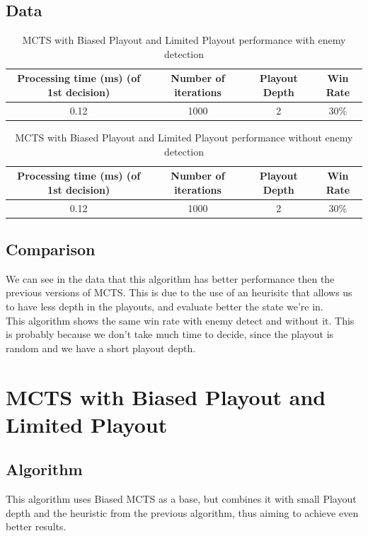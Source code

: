 \documentclass{article}
\begin{document}
  \subsection{Data}
  \begin{table}[h!]
    \centering
    \caption{MCTS with Biased Playout and Limited Playout performance with enemy detection}
    \label{tab:tableLimitedMCTS1}
    \begin{tabular}{c|c|c|c}
      \textbf{Processing time (ms) (of 1st decision)} & \textbf{Number of iterations} & \textbf{Playout Depth} & \textbf{Win Rate}\\
      \hline
      0.12 & 1000 & 2 & 30\%
    \end{tabular}
  \end{table}
  \begin{table}[h!]
    \centering
    \caption{MCTS with Biased Playout and Limited Playout performance without enemy detection}
    \label{tab:tableLimitedMCTS2}
    \begin{tabular}{c|c|c|c}
      \textbf{Processing time (ms) (of 1st decision)} & \textbf{Number of iterations} & \textbf{Playout Depth} & \textbf{Win Rate}\\
      \hline
      0.12 & 1000 & 2 & 30\%
    \end{tabular}
  \end{table}

  \subsection{Comparison}
  We can see in the data that this algorithm has better performance then the previous versions of MCTS. This is due to the use of an heurisitc that allows us to have less
  depth in the playouts, and evaluate better the state we're in. \\
  This algorithm shows the same win rate with enemy detect and without it. This is probably because we don't take much time to decide, since the playout is random
  and we have a short playout depth.\\

  \section{MCTS with Biased Playout and Limited Playout}

  \subsection{Algorithm}
  This algorithm uses Biased MCTS as a base, but combines it with small Playout depth and the heuristic from the previous algorithm, 
  thus aiming to achieve even better results.
  
\end{document}
